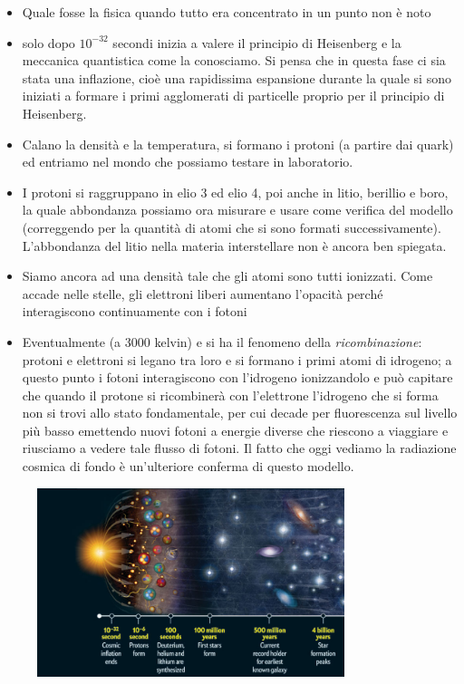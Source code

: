 \begin{itemize}
    \item Quale fosse la fisica quando tutto era concentrato in un punto non è noto
    \item solo dopo $10^{-32}$ secondi inizia a valere il principio di Heisenberg e la meccanica quantistica come la conosciamo. Si pensa che in questa fase ci sia stata una inflazione, cioè una rapidissima espansione durante la quale si sono iniziati a formare i primi agglomerati di particelle proprio per il principio di Heisenberg. 
    \item Calano la densità e la temperatura, si formano i protoni (a partire dai quark) ed entriamo nel mondo che possiamo testare in laboratorio.
    \item I protoni si raggruppano in elio 3 ed elio 4, poi anche in litio, berillio e boro, la quale abbondanza possiamo ora misurare e usare come verifica del modello (correggendo per la quantità di atomi che si sono formati successivamente). L'abbondanza del litio nella materia interstellare non è ancora ben spiegata.
    \item Siamo ancora ad una densità tale che gli atomi sono tutti ionizzati. Come accade nelle stelle, gli elettroni liberi aumentano l'opacità perché interagiscono continuamente con i fotoni
    \item Eventualmente (a 3000 kelvin) e si ha il fenomeno della \textit{ricombinazione}: protoni e elettroni si legano tra loro e si formano i primi atomi di idrogeno; a questo punto i fotoni interagiscono con l'idrogeno ionizzandolo e può capitare che quando il protone si ricombinerà con l'elettrone l'idrogeno che si forma non si trovi allo stato fondamentale, per cui decade per fluorescenza sul livello più basso emettendo nuovi fotoni a energie diverse che riescono a viaggiare e riusciamo a vedere tale flusso di fotoni. Il fatto che oggi vediamo la radiazione cosmica di fondo è un'ulteriore conferma di questo modello.
\end{itemize}

\begin{figure}[H]
    \centering
    \includegraphics[width=0.8\textwidth]{immagini16dic/bigbang.png}
\end{figure}

